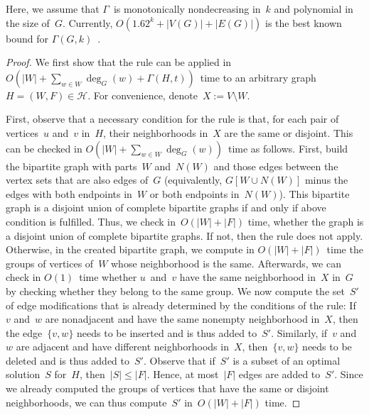 \documentclass[envcountsame,numbook,smallextended]{svjour3}
\numberwithin{equation}{section}
\numberwithin{figure}{section}
\newcommand{\packing}{\ensuremath{\mathcal H}}
\newcommand{\Time}{\ensuremath{\Gamma}}
\begin{document}
Here, we assume that
$\Time$~is monotonically nondecreasing in~$k$
and polynomial in the size of~$G$. Currently,
$O(1.62^k+|V(G)|+|E(G)|)$ is the best known bound
for $\Time(G,k)$~\cite{Boeck12}.
\begin{proof} 
  We first show that the rule can be applied
  in $O(|W|+\sum_{w\in W} \deg_G(w)+ \Time(H,t))$~time
  to an arbitrary graph~$H=(W,F)\in \packing$.
  For convenience, denote~$X:=V\setminus W$.

  First, observe that a necessary condition for the rule is that, for each pair of
  vertices~$u$ and~$v$ in~$H$, their neighborhoods in~$X$ are the same or disjoint.
 This can be checked in
  $O(|W|+\sum_{w\in W}\deg_G(w))$~time as follows.  First, build the bipartite graph with
  parts~$W$ and~$N(W)$ and those edges between the vertex sets that are also edges of~$G$
  (equivalently, $G[W\cup N(W)]$ minus the edges with both endpoints in~$W$ or both
  endpoints in~$N(W)$). This bipartite graph is a disjoint union of complete bipartite
  graphs if and only if above condition is fulfilled. Thus, we check in~$O(|W|+|F|)$ time,
  whether the graph is a disjoint union of complete bipartite graphs. If not, then the
  rule does not apply.
  Otherwise, in the created bipartite graph,
  we compute in $O(|W|+|F|)$~time
  the groups of vertices of~$W$ whose neighborhood is the same.
  Afterwards, we can check in $O(1)$~time
  whether $u$~and~$v$ have the same neighborhood in~$X$ in~\(G\)
  by checking whether they belong to the same group.
  We now compute the set~$S'$ of
  edge modifications that is already determined by the conditions of the rule: If~$v$
  and~$w$ are nonadjacent and have the same nonempty neighborhood in~$X$, then the
  edge~$\{v,w\}$ needs to be inserted and is thus added to~$S'$.  Similarly, if~$v$
  and~$w$ are adjacent and have different neighborhoods in~$X$, then~$\{v,w\}$ needs to be
  deleted and is thus added to~$S'$. Observe that if~$S'$ is a subset of an optimal
  solution~$S$ for~$H$, then~$|S|\le |F|$. Hence, at most~$|F|$ edges are added
  to~$S'$. Since we already computed the groups of vertices that have the same or disjoint
  neighborhoods, we can thus compute~$S'$ in~$O(|W|+|F|)$ time.


\end{proof}
\end{document}
